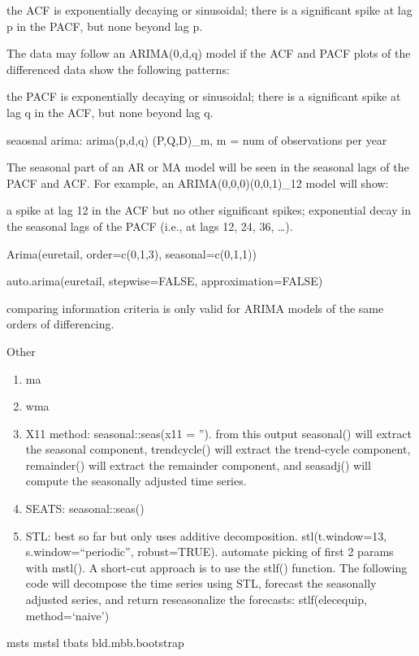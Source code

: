 \documentclass[]{book}
\theoremstyle{definition}
\theoremstyle{definition}
\theoremstyle{definition}
\theoremstyle{remark}
\begin{document}
the ACF is exponentially decaying or sinusoidal; there is a significant
spike at lag p in the PACF, but none beyond lag p.

The data may follow an ARIMA(0,d,q) model if the ACF and PACF plots of
the differenced data show the following patterns:

the PACF is exponentially decaying or sinusoidal; there is a significant
spike at lag q in the ACF, but none beyond lag q.

seaosnal arima: arima(p,d,q) (P,Q,D)\_m, m = num of observations per
year

The seasonal part of an AR or MA model will be seen in the seasonal lags
of the PACF and ACF. For example, an ARIMA(0,0,0)(0,0,1)\_12 model will
show:

a spike at lag 12 in the ACF but no other significant spikes;
exponential decay in the seasonal lags of the PACF (i.e., at lags 12,
24, 36, \ldots{}).

Arima(euretail, order=c(0,1,3), seasonal=c(0,1,1))

auto.arima(euretail, stepwise=FALSE, approximation=FALSE)

comparing information criteria is only valid for ARIMA models of the
same orders of differencing.

Other

\begin{enumerate}
\def\labelenumi{\arabic{enumi}.}
\item
  ma
\item
  wma
\item
  X11 method: seasonal::seas(x11 = ''). from this output seasonal() will
  extract the seasonal component, trendcycle() will extract the
  trend-cycle component, remainder() will extract the remainder
  component, and seasadj() will compute the seasonally adjusted time
  series.
\item
  SEATS: seasonal::seas()
\item
  STL: best so far but only uses additive decomposition.
  stl(t.window=13, s.window=``periodic'', robust=TRUE). automate picking
  of first 2 params with mstl(). A short-cut approach is to use the
  stlf() function. The following code will decompose the time series
  using STL, forecast the seasonally adjusted series, and return
  reseasonalize the forecasts: stlf(elecequip, method=`naive')
\end{enumerate}

msts \textbar{} mstsl \textbar{} tbats \textbar{} bld.mbb.bootstrap
\end{document}
